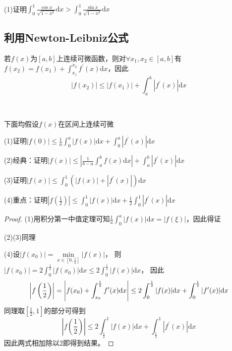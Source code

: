 ~

\begin{exercise}[一道特殊题]
  (1)证明$\int_0^1 \frac{\cos x}{\sqrt{1 - x^2}}\mathrm{d} x > \int_0^1 \frac{\sin x}{\sqrt{1 - x^2}}\mathrm{d} x$
\end{exercise}


\subsection{利用Newton-Leibniz公式}

\begin{theorem}
  若$f(x)$为$[a,b]$上连续可微函数，则对$\forall x_1,x_2 \in [a,b]$有$f(x_2) = f(x_1) + \int_{x_1}^{x_2}f^{\prime}(x)\mathrm{d} x$，因此
  \begin{equation*}
    |f(x_2)| \leq |f(x_1)| + \int_a^b |f^{\prime}(x)|\mathrm{d} x
  \end{equation*}
\end{theorem}

~

\begin{exercise}[几道经典题]
  下面均假设$f(x)$在区间上连续可微

  (1)证明$|f(0)| \leq \frac{1}{a} \int_0^a |f(x)|\mathrm{d} x + \int_0^a |f^{\prime}(x)| \mathrm{d} x$

  (2)经典：证明$|f(x)| \leq \left| \frac{1}{b-a}\int_a^b f(x)\mathrm{d}x \right| + \int_a^b |f^{\prime}(x)| \mathrm{d} x$

  (3)证明$|f(x)| \leq \int_0^1 (|f(x)| + |f^{\prime}(x)|)\mathrm{d} x$

  (4)重点：证明$\left| f \left( \frac{1}{2} \right) \right| \leq \int_0^1|f(x)| \mathrm{d} x + \frac{1}{2} \int_0^1 |f^{\prime}(x)| \mathrm{d} x$
\end{exercise}

\begin{proof}
  (1)用积分第一中值定理可知$\frac{1}{a}\int_0^a |f(x)|\mathrm{d} x = |f(\xi)|$，因此得证

  (2)(3)同理

  (4)设$|f(x_0)| = \min \limits_{x \in [0,\frac{1}{2}]} |f(x)|$，
  则$|f(x_0)| = 2 \int_0^{\frac{1}{2}}|f(x_0)|\mathrm{d} x \leq 2 \int_0^{\frac{1}{2}} |f(x)|\mathrm{d} x$，
  因此
  \begin{equation*}
      \left| f \left( \frac{1}{2} \right) \right| = \left| f(x_0) + \int_{x_0}^{\frac{1}{2}}f^{\prime}(x)\mathrm{d} x \right| \leq 2 \int_0^{\frac{1}{2}} |f(x)|\mathrm{d} x + \int_0^{\frac{1}{2}} |f^{\prime}(x)|\mathrm{d} x\\
  \end{equation*}
  同理取$[\frac{1}{2},1]$的部分可得到
  \begin{equation*}
    \left| f \left( \frac{1}{2} \right) \right| \leq 2 \int_{\frac{1}{2}}^1 |f(x)|\mathrm{d} x + \int_{\frac{1}{2}}^1 |f^{\prime}(x)|\mathrm{d} x
  \end{equation*}
  因此两式相加除以$2$即得到结果。
\end{proof}

